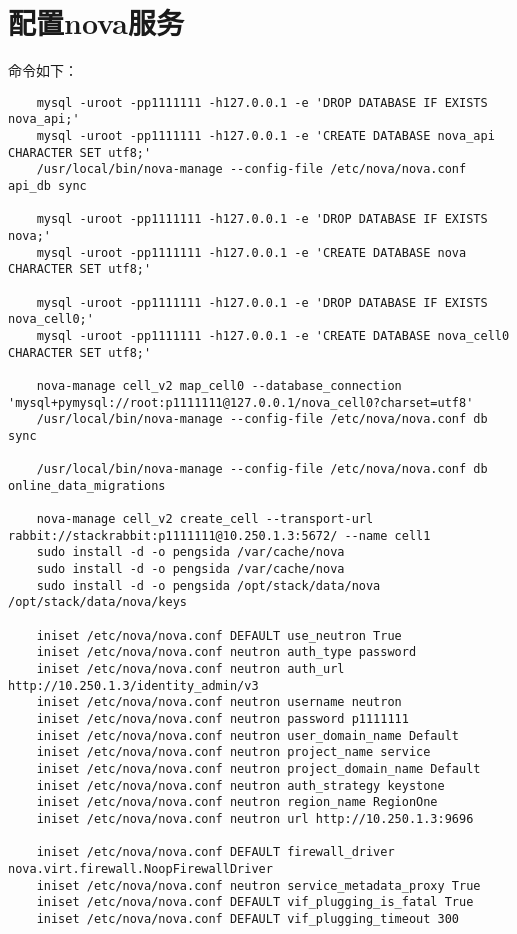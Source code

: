 \documentclass[a4paper,left=1.5cm,right=1.5cm,11pt]{article}
\begin{document}
\section{配置nova服务}
	命令如下：
	\begin{lstlisting}
	mysql -uroot -pp1111111 -h127.0.0.1 -e 'DROP DATABASE IF EXISTS nova_api;'
	mysql -uroot -pp1111111 -h127.0.0.1 -e 'CREATE DATABASE nova_api CHARACTER SET utf8;'
	/usr/local/bin/nova-manage --config-file /etc/nova/nova.conf api_db sync
	
	mysql -uroot -pp1111111 -h127.0.0.1 -e 'DROP DATABASE IF EXISTS nova;'
	mysql -uroot -pp1111111 -h127.0.0.1 -e 'CREATE DATABASE nova CHARACTER SET utf8;'

	mysql -uroot -pp1111111 -h127.0.0.1 -e 'DROP DATABASE IF EXISTS nova_cell0;'
	mysql -uroot -pp1111111 -h127.0.0.1 -e 'CREATE DATABASE nova_cell0 CHARACTER SET utf8;'
	
	nova-manage cell_v2 map_cell0 --database_connection 'mysql+pymysql://root:p1111111@127.0.0.1/nova_cell0?charset=utf8'
	/usr/local/bin/nova-manage --config-file /etc/nova/nova.conf db sync

	/usr/local/bin/nova-manage --config-file /etc/nova/nova.conf db online_data_migrations

	nova-manage cell_v2 create_cell --transport-url rabbit://stackrabbit:p1111111@10.250.1.3:5672/ --name cell1
	sudo install -d -o pengsida /var/cache/nova
	sudo install -d -o pengsida /var/cache/nova
	sudo install -d -o pengsida /opt/stack/data/nova /opt/stack/data/nova/keys

	iniset /etc/nova/nova.conf DEFAULT use_neutron True
	iniset /etc/nova/nova.conf neutron auth_type password
	iniset /etc/nova/nova.conf neutron auth_url http://10.250.1.3/identity_admin/v3
	iniset /etc/nova/nova.conf neutron username neutron
	iniset /etc/nova/nova.conf neutron password p1111111
	iniset /etc/nova/nova.conf neutron user_domain_name Default
	iniset /etc/nova/nova.conf neutron project_name service
	iniset /etc/nova/nova.conf neutron project_domain_name Default
	iniset /etc/nova/nova.conf neutron auth_strategy keystone
	iniset /etc/nova/nova.conf neutron region_name RegionOne
	iniset /etc/nova/nova.conf neutron url http://10.250.1.3:9696
	
	iniset /etc/nova/nova.conf DEFAULT firewall_driver nova.virt.firewall.NoopFirewallDriver
	iniset /etc/nova/nova.conf neutron service_metadata_proxy True
	iniset /etc/nova/nova.conf DEFAULT vif_plugging_is_fatal True
	iniset /etc/nova/nova.conf DEFAULT vif_plugging_timeout 300


\end{lstlisting}
\end{document}
